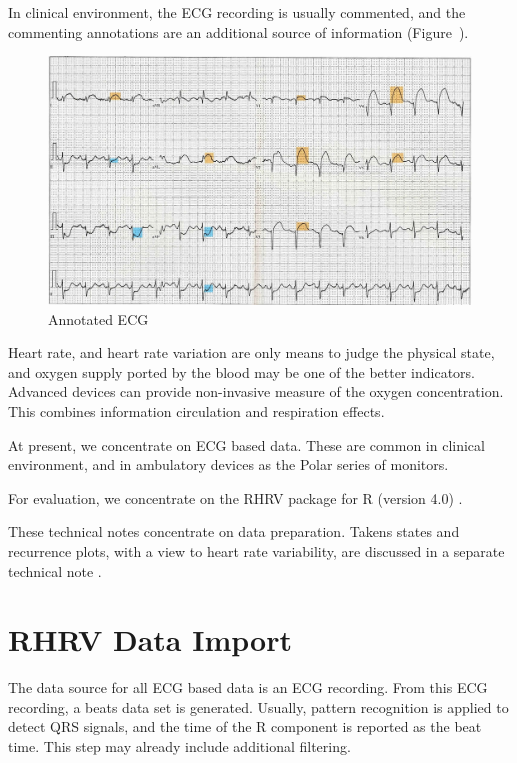 \documentclass[a4paper, english, utf8]{amsart}
\newcommand{\figref}[1]{Figure\ \Vref{#1}}
\begin{document}
In  clinical environment, the ECG recording is usually commented, and
the commenting annotations are an additional source of information
(\figref{fig:AnnECG}).
\begin{figure}[htbp]
\begin{center}
\includegraphics[width=0.8\linewidth]{../media/12-Lead-ECG-showing-ST-Elevation-orange.jpg}

\caption{Annotated ECG}
\label{fig:AnnECG}
\end{center}
\end{figure}


Heart rate, and heart rate variation are only means to judge the
physical state, and oxygen supply ported by the blood may be one of the
better indicators. Advanced devices can provide non-invasive measure of
the oxygen concentration. This combines information circulation and
respiration effects.

At present, we concentrate on ECG based data. These are common in
clinical environment, and in ambulatory devices as the Polar series of
monitors.

For evaluation, we concentrate on the RHRV package for R (version 4.0) \cite{RHRV-Mendez:2014aa}.

These technical notes concentrate on data preparation. Takens states and recurrence plots, with a view to heart rate variability, are discussed in a separate technical note \cite{Sawitzki:2013recurrence}.

\section{RHRV Data Import}

The data source for all ECG based data is an ECG recording. 
From this ECG recording, a beats data set is generated. 
Usually, pattern recognition is applied to detect QRS signals, and the 
time of the R component is reported as the beat time. 
This step may already include additional filtering.
\end{document}
